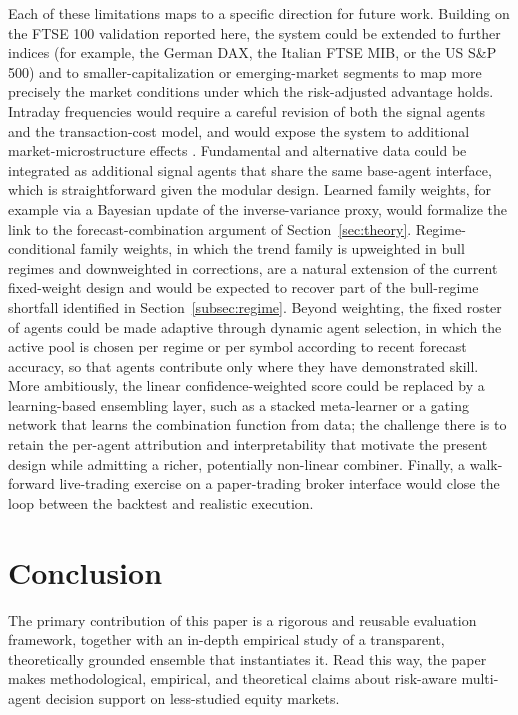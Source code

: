\documentclass{ieeeaccess}
\begin{document}
Each of these limitations maps to a specific direction for future work. Building on the FTSE 100 validation reported here, the system could be extended to further indices (for example, the German DAX, the Italian FTSE MIB, or the US S\&P 500) and to smaller-capitalization or emerging-market segments to map more precisely the market conditions under which the risk-adjusted advantage holds. Intraday frequencies would require a careful revision of both the signal agents and the transaction-cost model, and would expose the system to additional market-microstructure effects \cite{tusien2025mining}. Fundamental and alternative data could be integrated as additional signal agents that share the same base-agent interface, which is straightforward given the modular design. Learned family weights, for example via a Bayesian update of the inverse-variance proxy, would formalize the link to the forecast-combination argument of Section~\ref{sec:theory}. Regime-conditional family weights, in which the trend family is upweighted in bull regimes and downweighted in corrections, are a natural extension of the current fixed-weight design and would be expected to recover part of the bull-regime shortfall identified in Section~\ref{subsec:regime}. Beyond weighting, the fixed roster of agents could be made adaptive through dynamic agent selection, in which the active pool is chosen per regime or per symbol according to recent forecast accuracy, so that agents contribute only where they have demonstrated skill. More ambitiously, the linear confidence-weighted score could be replaced by a learning-based ensembling layer, such as a stacked meta-learner or a gating network that learns the combination function from data; the challenge there is to retain the per-agent attribution and interpretability that motivate the present design while admitting a richer, potentially non-linear combiner. Finally, a walk-forward live-trading exercise on a paper-trading broker interface would close the loop between the backtest and realistic execution.

\section{Conclusion}
\label{sec:conclusion}

The primary contribution of this paper is a rigorous and reusable evaluation framework, together with an in-depth empirical study of a transparent, theoretically grounded ensemble that instantiates it. Read this way, the paper makes methodological, empirical, and theoretical claims about risk-aware multi-agent decision support on less-studied equity markets.
\end{document}
